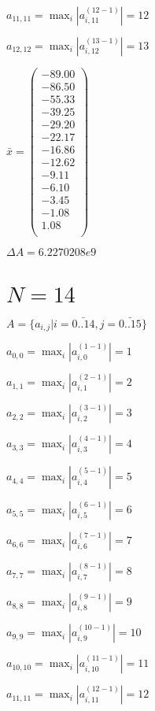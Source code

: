 \documentclass[a4paper,12pt]{article}
\begin{document}
$a _{ 11, 11 } =  \max _i |a _{ i, 11 } ^{ (12 - 1) } | = 12$

$a _{ 12, 12 } =  \max _i |a _{ i, 12 } ^{ (13 - 1) } | = 13$

$\bar { x } = \begin{pmatrix}
-89.00 \\
-86.50 \\
-55.33 \\
-39.25 \\
-29.20 \\
-22.17 \\
-16.86 \\
-12.62 \\
-9.11 \\
-6.10 \\
-3.45 \\
-1.08 \\
1.08 \\
\end{pmatrix}
$

$\Delta A = 6.2270208e9$



\section{ $N = 14$ }
$A = \{ a _{ i, j } | i = \bar { 0..14 }, j = \bar { 0..15 } \}$

$a _{ 0, 0 } =  \max _i |a _{ i, 0 } ^{ (1 - 1) } | = 1$

$a _{ 1, 1 } =  \max _i |a _{ i, 1 } ^{ (2 - 1) } | = 2$

$a _{ 2, 2 } =  \max _i |a _{ i, 2 } ^{ (3 - 1) } | = 3$

$a _{ 3, 3 } =  \max _i |a _{ i, 3 } ^{ (4 - 1) } | = 4$

$a _{ 4, 4 } =  \max _i |a _{ i, 4 } ^{ (5 - 1) } | = 5$

$a _{ 5, 5 } =  \max _i |a _{ i, 5 } ^{ (6 - 1) } | = 6$

$a _{ 6, 6 } =  \max _i |a _{ i, 6 } ^{ (7 - 1) } | = 7$

$a _{ 7, 7 } =  \max _i |a _{ i, 7 } ^{ (8 - 1) } | = 8$

$a _{ 8, 8 } =  \max _i |a _{ i, 8 } ^{ (9 - 1) } | = 9$

$a _{ 9, 9 } =  \max _i |a _{ i, 9 } ^{ (10 - 1) } | = 10$

$a _{ 10, 10 } =  \max _i |a _{ i, 10 } ^{ (11 - 1) } | = 11$

$a _{ 11, 11 } =  \max _i |a _{ i, 11 } ^{ (12 - 1) } | = 12$
\end{document}
